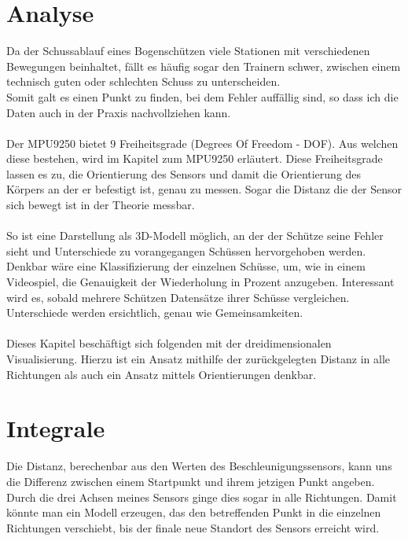 \section{Analyse}
Da der Schussablauf eines Bogenschützen viele Stationen mit verschiedenen Bewegungen 
beinhaltet, fällt es häufig sogar den Trainern schwer, zwischen einem technisch guten
oder schlechten Schuss zu unterscheiden.\\ 
Somit galt es einen Punkt zu finden, bei dem Fehler auffällig sind, so dass ich die Daten auch in 
der Praxis nachvollziehen kann.\\
\\
Der MPU9250 bietet 9 Freiheitsgrade (Degrees Of Freedom - DOF). Aus welchen diese bestehen, wird
im Kapitel zum MPU9250 erläutert. Diese Freiheitsgrade lassen es zu, die Orientierung des Sensors 
und damit die Orientierung des Körpers an der er befestigt ist, genau zu messen. Sogar die Distanz 
die der Sensor sich bewegt ist in der Theorie messbar.\\
\\
So ist eine Darstellung als 3D-Modell möglich, an der der Schütze seine Fehler sieht und Unterschiede
zu vorangegangen Schüssen hervorgehoben werden. \\
Denkbar wäre eine Klassifizierung der einzelnen Schüsse, um, wie in einem Videospiel, die Genauigkeit
der Wiederholung in Prozent anzugeben. Interessant wird es, sobald mehrere Schützen Datensätze
ihrer Schüsse vergleichen. Unterschiede werden ersichtlich, genau wie Gemeinsamkeiten. \\
\\
Dieses Kapitel beschäftigt sich folgenden mit der dreidimensionalen Visualisierung. Hierzu ist ein Ansatz mithilfe 
der zurückgelegten Distanz in alle Richtungen als auch ein Ansatz mittels Orientierungen denkbar.

\section{Integrale}
Die Distanz, berechenbar aus den Werten des Beschleunigungssensors, kann uns die Differenz zwischen einem Startpunkt
und ihrem jetzigen Punkt angeben. Durch die drei Achsen meines Sensors ginge dies sogar in alle Richtungen. Damit 
könnte man ein Modell erzeugen, das den betreffenden Punkt in die einzelnen Richtungen verschiebt, bis der finale
neue Standort des Sensors erreicht wird. 


